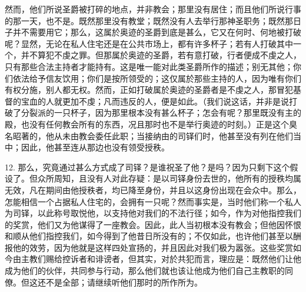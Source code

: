 然而，他们所说圣爵被打碎的地点，并非教会；那里没有居住；而且他们所说行事的那一天，也不是。既然那里没有教堂；既然没有人去举行那神圣职务；既然那日子并不需要用它；那么，这属於奥迹的圣爵到底是甚么，它又在何时、何地被打破呢？显然，无论在私人住宅还是在公共市场上，都有许多杯子；若有人打破其中一个，并不算犯不虔之罪。但那属於奥迹的圣爵，若有意打破，行者便成不虔之人，只有那些合法主持者才能持有。这是唯一能对此类圣爵所作的描述；别无其他；你们依法给予信友饮用；你们是按所领受的；这仅属於那些主持的人，因为唯有你们有权分施，别人都无权。然而，正如打破属於奥迹的圣爵者是不虔之人，那冒犯基督的宝血的人就更加不虔；凡而违反的人，便是如此。（我们说这话，并非是说打破了分裂派的一只杯子，因为那里根本没有甚么杯子；怎会有呢？那里既没有主的殿，也没有任何教会所有的东西，况且那时也不是举行奥迹的时刻。）正是这个臭名昭著的，他从未由教会委任此职；当接纳由的司铎们时，他甚至没有列在他们当中；因此，他甚至连从那边也没有领受授秩。\par

12. 那么，究竟通过甚么方式成了司铎？是谁祝圣了他？是吗？因为只剩下这个假设了。但众所周知，且没有人对此存疑：是以司铎身份去世的，他所有的授秩均属无效，凡在期间由他授秩者，均已降至身份，并且以这身份出现在会众中。那么，怎能相信一个占据私人住宅的，会拥有一只呢？然而事实是，当时他们称一个私人为司铎，以此称号取悦他，以支持他对我们的不法行径；如今，作为对他指控我们的奖赏，他们又为他谋得了一座教会。因此，此人当初根本没有教会；但他因怀恨和顺从他们指控我们，如今得到了他昔日所没有的；不仅如此，也许他们甚至以酬报他的效劳，因为他就是这样四处宣扬的，并且因此对我们极为嚣张。这些奖赏如今由主教们赐给控诉者和诽谤者，但其实，对於共犯而言，理应是：既然他们让他成为他们的伙伴，共同参与行动，那么他们就也该让他成为他们自己主教职的同僚。但这还不是全部；请继续听他们那时的所作所为。\par

